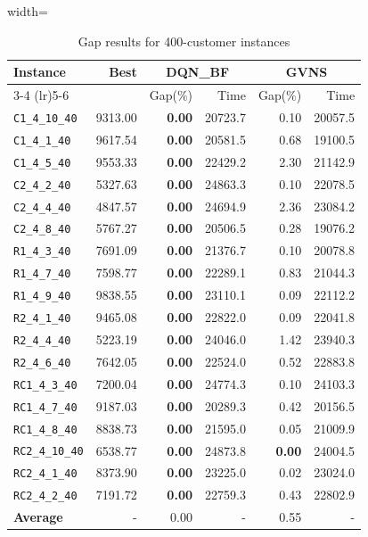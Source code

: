 \begin{table}[ht]
\centering
\small
\setlength{\tabcolsep}{5pt}
\caption{Gap results for 400-customer instances}
\vspace{4mm}
\begin{adjustbox}{width=\textwidth}
\begin{tabular}{l r r r @{\hspace{8pt}} r r @{\hspace{8pt}}}
\toprule
\multirow{2}{*}{Instance} & \multirow{2}{*}{Best} & \multicolumn{2}{c}{DQN\_BF} & \multicolumn{2}{c}{GVNS} \\
\cmidrule(lr){3-4} \cmidrule(lr){5-6}
 &  & Gap(\%) & Time & Gap(\%) & Time \\
\midrule
\texttt{C1\_4\_10\_40} & 9313.00 & \textbf{0.00} & 20723.7 & 0.10 & 20057.5 \\
\texttt{C1\_4\_1\_40} & 9617.54 & \textbf{0.00} & 20581.5 & 0.68 & 19100.5 \\
\texttt{C1\_4\_5\_40} & 9553.33 & \textbf{0.00} & 22429.2 & 2.30 & 21142.9 \\
\texttt{C2\_4\_2\_40} & 5327.63 & \textbf{0.00} & 24863.3 & 0.10 & 22078.5 \\
\texttt{C2\_4\_4\_40} & 4847.57 & \textbf{0.00} & 24694.9 & 2.36 & 23084.2 \\
\texttt{C2\_4\_8\_40} & 5767.27 & \textbf{0.00} & 20506.5 & 0.28 & 19076.2 \\
\texttt{R1\_4\_3\_40} & 7691.09 & \textbf{0.00} & 21376.7 & 0.10 & 20078.8 \\
\texttt{R1\_4\_7\_40} & 7598.77 & \textbf{0.00} & 22289.1 & 0.83 & 21044.3 \\
\texttt{R1\_4\_9\_40} & 9838.55 & \textbf{0.00} & 23110.1 & 0.09 & 22112.2 \\
\texttt{R2\_4\_1\_40} & 9465.08 & \textbf{0.00} & 22822.0 & 0.09 & 22041.8 \\
\texttt{R2\_4\_4\_40} & 5223.19 & \textbf{0.00} & 24046.0 & 1.42 & 23940.3 \\
\texttt{R2\_4\_6\_40} & 7642.05 & \textbf{0.00} & 22524.0 & 0.52 & 22883.8 \\
\texttt{RC1\_4\_3\_40} & 7200.04 & \textbf{0.00} & 24774.3 & 0.10 & 24103.3 \\
\texttt{RC1\_4\_7\_40} & 9187.03 & \textbf{0.00} & 20289.3 & 0.42 & 20156.5 \\
\texttt{RC1\_4\_8\_40} & 8838.73 & \textbf{0.00} & 21595.0 & 0.05 & 21009.9 \\
\texttt{RC2\_4\_10\_40} & 6538.77 & \textbf{0.00} & 24873.8 & \textbf{0.00} & 24004.5 \\
\texttt{RC2\_4\_1\_40} & 8373.90 & \textbf{0.00} & 23225.0 & 0.02 & 23024.0 \\
\texttt{RC2\_4\_2\_40} & 7191.72 & \textbf{0.00} & 22759.3 & 0.43 & 22802.9 \\
\midrule
\textbf{Average} & - & 0.00 & - & 0.55 & - \\
\bottomrule
\end{tabular}
\end{adjustbox}
\end{table}